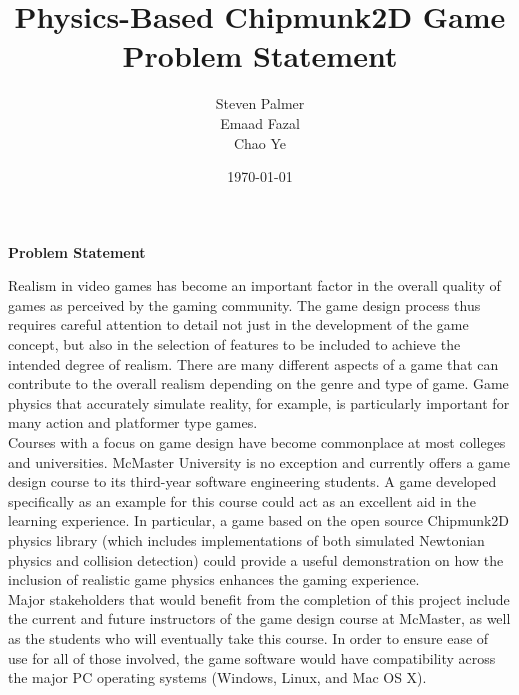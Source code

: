 \documentclass[12pt, titlepage]{article}
\begin{document}
\title{\bf Physics-Based Chipmunk2D Game\\[\baselineskip]\Large Problem Statement}
\author{Steven Palmer\\Emaad Fazal\\Chao Ye}
\date{\today}
	
\maketitle

\begin{center}
\Large \bf Problem Statement
\end{center}

Realism in video games has become an important factor in the overall quality of games as perceived by the gaming community.  The game design process thus requires careful attention to detail not just in the development of the game concept, but also in the selection of features to be included to achieve the intended degree of realism.  There are many different aspects of a game that can contribute to the overall realism depending on the genre and type of game.  Game physics that accurately simulate reality, for example, is particularly important for many action and platformer type games.\\

Courses with a focus on game design have become commonplace at most colleges and universities.  McMaster University is no exception and currently offers a game design course to its third-year software engineering students.  A game developed specifically as an example for this course could act as an excellent aid in the learning experience.  In particular, a game based on the open source Chipmunk2D physics library (which includes implementations of both simulated Newtonian physics and collision detection) could provide a useful demonstration on how the inclusion of realistic game physics enhances the gaming experience.\\

Major stakeholders that would benefit from the completion of this project include the current and future instructors of the game design course at McMaster, as well as the students who will eventually take this course.  In order to ensure ease of use for all of those involved, the game software would have compatibility across the major PC operating systems (Windows, Linux, and Mac OS X).
\end{document}
